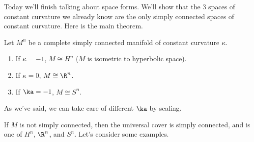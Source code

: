 
Today we'll finish talking about space forms. We'll show that the 3 spaces of constant curvature we already know are the only simply connected spaces of constant curvature. Here is the main theorem.

\begin{thm}
Let $M^n$ be a complete simply connected manifold of constant curvature $\kappa$.
\begin{enumerate}
\item
If $\kappa=-1$, $M\cong H^n$ ($M$ is isometric to hyperbolic space). 
\item
If $\kappa=0$, $M\cong \R^n$. 
\item
If $\ka=-1$, $M\cong S^n$.
\end{enumerate}
\end{thm}
As we've said, we can take care of different $\ka$ by scaling.

If $M$ is not simply connected, then the universal cover is simply connected, and is one of $H^n$, $\R^n$, and $S^n$. Let's consider some examples.

